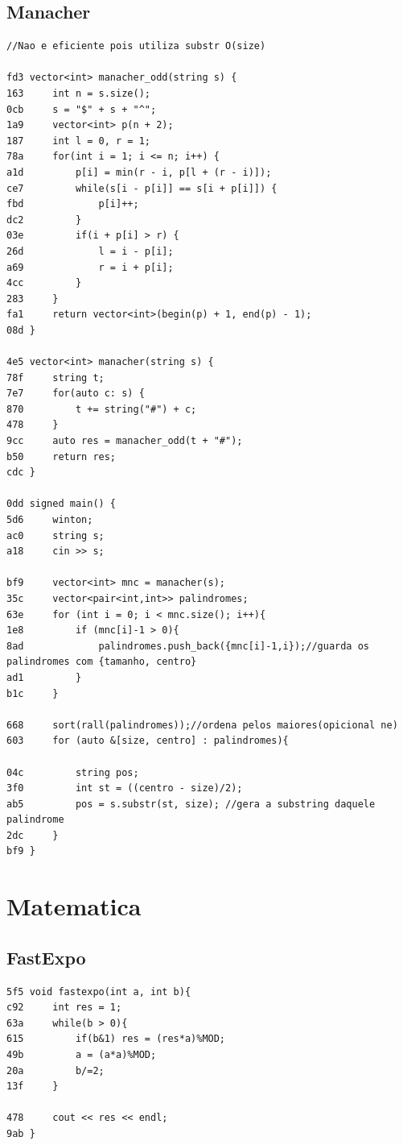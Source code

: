 \documentclass[11pt, a4paper, twoside]{article}
\begin{document}
\subsection{Manacher}
\begin{lstlisting}
//Nao e eficiente pois utiliza substr O(size)

fd3 vector<int> manacher_odd(string s) {
163     int n = s.size();
0cb     s = "$" + s + "^";
1a9     vector<int> p(n + 2);
187     int l = 0, r = 1;
78a     for(int i = 1; i <= n; i++) {
a1d         p[i] = min(r - i, p[l + (r - i)]);
ce7         while(s[i - p[i]] == s[i + p[i]]) {
fbd             p[i]++;
dc2         }
03e         if(i + p[i] > r) {
26d             l = i - p[i];
a69             r = i + p[i];
4cc         }
283     }
fa1     return vector<int>(begin(p) + 1, end(p) - 1);
08d }

4e5 vector<int> manacher(string s) {
78f     string t;
7e7     for(auto c: s) {
870         t += string("#") + c;
478     }
9cc     auto res = manacher_odd(t + "#");
b50     return res;
cdc }

0dd signed main() {
5d6     winton;
ac0     string s;
a18     cin >> s;
    
bf9     vector<int> mnc = manacher(s);
35c     vector<pair<int,int>> palindromes;
63e     for (int i = 0; i < mnc.size(); i++){
1e8         if (mnc[i]-1 > 0){
8ad             palindromes.push_back({mnc[i]-1,i});//guarda os palindromes com {tamanho, centro}
ad1         }
b1c     }
    
668     sort(rall(palindromes));//ordena pelos maiores(opicional ne)
603     for (auto &[size, centro] : palindromes){
    
04c         string pos;
3f0         int st = ((centro - size)/2);
ab5         pos = s.substr(st, size); //gera a substring daquele palindrome
2dc     }
bf9 }
\end{lstlisting}



%
%

\section{Matematica}

\subsection{FastExpo}
\begin{lstlisting}
5f5 void fastexpo(int a, int b){
c92     int res = 1;
63a     while(b > 0){
615         if(b&1) res = (res*a)%MOD;
49b         a = (a*a)%MOD;
20a         b/=2;
13f     }
     
478     cout << res << endl;
9ab }
\end{lstlisting}
\end{document}
